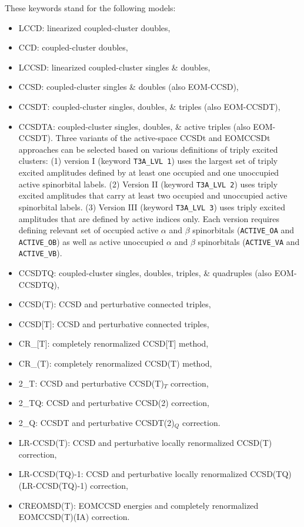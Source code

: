 These keywords stand for the following models:
\begin{itemize}
\item LCCD: linearized coupled-cluster doubles,
\item CCD: coupled-cluster doubles,
\item LCCSD: linearized coupled-cluster singles \& doubles,
\item CCSD: coupled-cluster singles \& doubles (also EOM-CCSD),
\item CCSDT: coupled-cluster singles, doubles, \& triples (also EOM-CCSDT),
\item CCSDTA: coupled-cluster singles, doubles, \& active triples (also EOM-CCSDT).
Three variants of the active-space CCSDt and EOMCCSDt approaches can be selected based on 
various definitions of triply excited clusters: (1) version I (keyword {\tt T3A\_LVL  1}) uses
the largest set of triply excited amplitudes defined by at least one occupied and one unoccupied 
active spinorbital labels. (2) Version II (keyword {\tt T3A\_LVL  2}) uses
triply excited amplitudes that carry at least two occupied and unoccupied
active spinorbital labels. (3) Version III (keyword {\tt T3A\_LVL  3}) uses
triply excited amplitudes that are defined by active indices only.
Each version requires defining relevant set of occupied active $\alpha$ and $\beta$ spinorbitals
({\tt ACTIVE\_OA} and {\tt ACTIVE\_OB}) as well as active unoccupied $\alpha$ and $\beta$ spinorbitals
({\tt ACTIVE\_VA} and {\tt ACTIVE\_VB}).
\item CCSDTQ: coupled-cluster singles, doubles, triples, \& quadruples (also EOM-CCSDTQ),
\item CCSD(T): CCSD and perturbative connected triples,
\item CCSD[T]: CCSD and perturbative connected triples,
\item CR\_[T]: completely renormalized CCSD[T] method,
\item CR\_(T): completely renormalized CCSD(T) method,
\item 2\_T: CCSD and perturbative CCSD(T)$_T$ correction,
\item 2\_TQ: CCSD and  perturbative CCSD(2) correction,
\item 2\_Q: CCSDT and perturbative CCSDT(2)$_Q$ correction.
\item LR-CCSD(T): CCSD and perturbative locally renormalized CCSD(T) correction,
\item LR-CCSD(TQ)-1: CCSD and perturbative locally renormalized CCSD(TQ) (LR-CCSD(TQ)-1) correction,
\item CREOMSD(T): EOMCCSD energies and completely renormalized EOMCCSD(T)(IA) correction.

\end{itemize}
